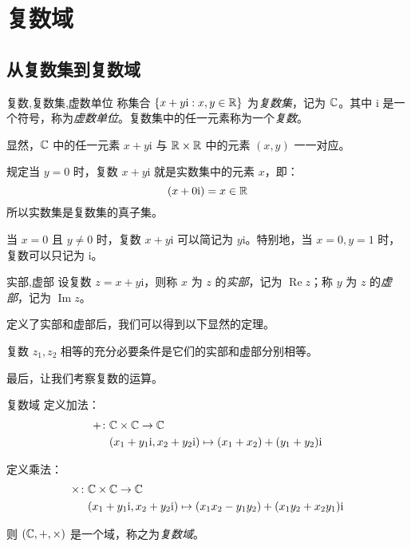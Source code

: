 
\section{复数域}

\subsection{从复数集到复数域}

\begin{definition}{复数,复数集,虚数单位}
	称集合 $\{x + y \mathrm i: x, y \in \mathbb R\}$ 为\emph{复数集}，记为 $\mathbb C$。其中 $\mathrm i$ 是一个符号，称为\emph{虚数单位}。复数集中的任一元素称为一个\emph{复数}。
\end{definition}

显然，$\mathbb C$ 中的任一元素 $x + y \mathrm i$ 与 $\mathbb R \times \mathbb R$ 中的元素 $(x, y)$ 一一对应。

规定当 $y = 0$ 时，复数 $x + y \mathrm i$ 就是实数集中的元素 $x$，即：
$$
(x + 0 \mathrm i) = x \in \mathbb R
$$
所以实数集是复数集的真子集。

当 $x = 0$ 且 $y \ne 0$ 时，复数 $x + y \mathrm i$ 可以简记为 $y \mathrm i$。特别地，当 $x = 0, y = 1$ 时，复数可以只记为 $\mathrm i$。

\begin{definition}{实部,虚部}
	设复数 $z = x + y \mathrm i$，则称 $x$ 为 $z$ 的\emph{实部}，记为 $\operatorname{Re} z$；称 $y$ 为 $z$ 的\emph{虚部}，记为 $\operatorname{Im} z$。
\end{definition}

定义了实部和虚部后，我们可以得到以下显然的定理。

\begin{theorem}[复数相等]
	复数 $z_1, z_2$ 相等的充分必要条件是它们的实部和虚部分别相等。
\end{theorem}

最后，让我们考察复数的运算。

\begin{definition}{复数域}
	定义加法：
	$$
	\begin{aligned}
		{+} \colon & \mathbb C \times \mathbb C \to \mathbb C
		\\&
		(x_1 + y_1 \mathrm i, x_2 + y_2 \mathrm i) \mapsto (x_1 + x_2) + (y_1 + y_2) \mathrm i
	\end{aligned}
	$$

	定义乘法：
	$$
	\begin{aligned}
		{\times} \colon & \mathbb C \times \mathbb C \to \mathbb C
		\\&
		(x_1 + y_1 \mathrm i, x_2 + y_2 \mathrm i) \mapsto (x_1 x_2 - y_1 y_2) + (x_1 y_2 + x_2 y_1) \mathrm i
	\end{aligned}
	$$

	则 $(\mathbb C, {+}, {\times})$ 是一个域，称之为\emph{复数域}。
\end{definition}

